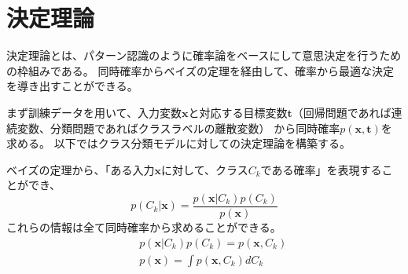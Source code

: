 \documentclass[a4j,twocolumn, uplatex]{jsarticle}
\begin{document}
\section{決定理論}
決定理論とは、パターン認識のように確率論をベースにして意思決定を行うための枠組みである。
同時確率からベイズの定理を経由して、確率から最適な決定を導き出すことができる。

まず訓練データを用いて、入力変数$\bm{x}$と対応する目標変数$\bm{t}$（回帰問題であれば連続変数、分類問題であればクラスラベルの離散変数）
から同時確率$p(\bm{x},\bm{t})$を求める。
以下ではクラス分類モデルに対しての決定理論を構築する。

ベイズの定理から、「ある入力$\bm{x}$に対して、クラス$C_k$である確率」を表現することができ、
\begin{equation}
  p(C_k|\bm{x}) = \frac{p(\bm{x}|C_k)p(C_k)}{p(\bm{x})}
\end{equation}
これらの情報は全て同時確率から求めることができる。
\begin{eqnarray}
  && p(\bm{x}|C_k)p(C_k) = p(\bm{x}, C_k) \\
  && p(\bm{x}) =  \int p(\bm{x}, C_k) dC_k
\end{eqnarray}
\end{document}
